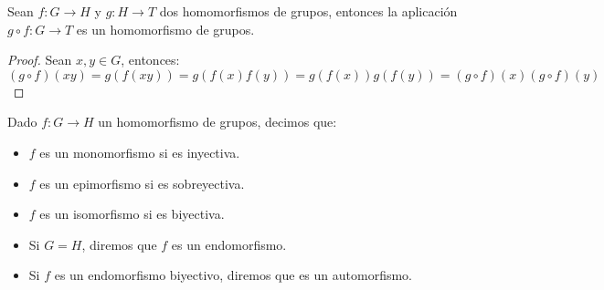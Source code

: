 \begin{prop}\label{prop:comp_homomorf}
    Sean $f:G\to H$ y $g:H\to T$ dos homomorfismos de grupos, entonces la aplicación $g\circ f:G\to T$ es un homomorfismo de grupos.
    \begin{proof}
        Sean $x,y\in G$, entonces:
        \begin{equation*}
            (g\circ f)(xy) = g(f(xy)) = g(f(x)f(y)) = g(f(x)) g(f(y)) = (g\circ f)(x)(g\circ f)(y)
        \end{equation*}
    \end{proof}
\end{prop}

\begin{definicion}
    Dado $f:G\to H$ un homomorfismo de grupos, decimos que:
    \begin{itemize}
        \item $f$ es un monomorfismo si es inyectiva.
        \item $f$ es un epimorfismo si es sobreyectiva.
        \item $f$ es un isomorfismo si es biyectiva.
        \item Si $G=H$, diremos que $f$ es un endomorfismo.
        \item Si $f$ es un endomorfismo biyectivo, diremos que es un automorfismo.
    \end{itemize}
\end{definicion}

